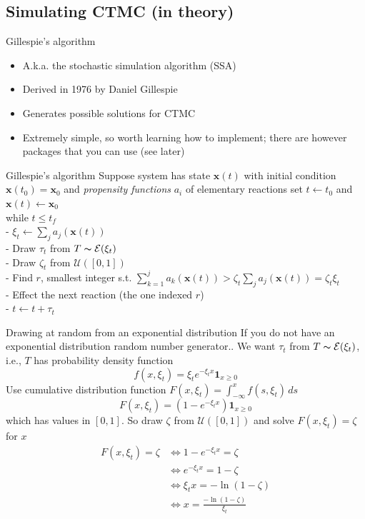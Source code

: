 \documentclass[aspectratio=43]{beamer}
\begin{document}
\subsection{Simulating CTMC (in theory)}

\begin{frame}{Gillespie's algorithm}
    \begin{itemize}
        \item A.k.a. the stochastic simulation algorithm (SSA)
        \item Derived in 1976 by Daniel Gillespie
        \item Generates possible solutions for CTMC
        \item Extremely simple, so worth learning how to implement; there are however packages that you can use (see later)
    \end{itemize}
\end{frame}


\begin{frame}{Gillespie's algorithm}
Suppose system has state $\mathbf{x}(t)$ with initial condition $\mathbf{x}(t_0)=\mathbf{x}_0$ and \emph{propensity functions} $a_i$ of elementary reactions
\vfill
set $t\leftarrow t_0$ and $\mathbf{x}(t)\leftarrow \mathbf{x}_0$\\
while {$t\leq t_f$}\\
- $\xi_t\leftarrow \sum_j a_j(\mathbf{x}(t))$\\
- Draw $\tau_t$ from $T\thicksim \mathcal{E}(\xi_t)$\\
- Draw $\zeta_t$ from $\mathcal{U}([0,1])$\\
- Find $r$, smallest integer s.t. $\sum_{k=1}^j a_k(\mathbf{x}(t))> \zeta_t\sum_j a_j(\mathbf{x}(t))=\zeta_t\xi_t$\\
- Effect the next reaction (the one indexed $r$)\\
- $t\leftarrow t+\tau_t$\\    
\end{frame}


\begin{frame}{Drawing at random from an exponential distribution}
    If you do not have an exponential distribution random number generator.. We want $\tau_t$ from $T\thicksim\mathcal{E}(\xi_t)$, i.e., $T$ has probability density function
    $$
    f(x,\xi_t)=
    \xi_te^{-\xi_t x}\mathbf{1}_{x\geq 0}
    $$
    Use cumulative distribution function $F(x,\xi_t)=\int_{-\infty}^x f(s,\xi_t)\,ds$
    $$
    F(x,\xi_t)=
    (1-e^{-\xi_t x})\mathbf{1}_{x\geq 0}
    $$
    which has values in $[0,1]$. So draw $\zeta$ from $\mathcal{U}([0,1])$ and solve $F(x,\xi_t)=\zeta$ for $x$
    \begin{align*}
    F(x,\xi_t)=\zeta & \Leftrightarrow 1-e^{-\xi_tx}=\zeta \\
    &\Leftrightarrow e^{-\xi_tx} = 1-\zeta \\
    &\Leftrightarrow \xi_tx = -\ln(1-\zeta) \\
    &\Leftrightarrow \boxed{x = \frac{-\ln(1-\zeta)}{\xi_t}}
    \end{align*}
\end{frame}
\end{document}
